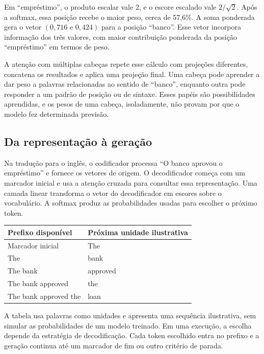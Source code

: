 \documentclass[12pt,a4paper]{article}
\begin{document}
Em ``empréstimo'', o produto escalar vale 2, e o escore escalado vale $2/\sqrt{2}$. Após a softmax, essa posição recebe o maior peso, cerca de 57,6\%. A soma ponderada gera o vetor $(0,716 \text{ e } 0,424)$ para a posição ``banco''. Esse vetor incorpora informação dos três valores, com maior contribuição ponderada da posição ``empréstimo'' em termos de peso.

A atenção com múltiplas cabeças repete esse cálculo com projeções diferentes, concatena os resultados e aplica uma projeção final. Uma cabeça pode aprender a dar peso a palavras relacionadas ao sentido de ``banco'', enquanto outra pode responder a um padrão de posição ou de sintaxe. Esses papéis são possibilidades aprendidas, e os pesos de uma cabeça, isoladamente, não provam por que o modelo fez determinada previsão.

\subsection{Da representação à geração}

Na tradução para o inglês, o codificador processa ``O banco aprovou o empréstimo'' e fornece os vetores de origem. O decodificador começa com um marcador inicial e usa a atenção cruzada para consultar essa representação. Uma camada linear transforma o vetor do decodificador em escores sobre o vocabulário. A softmax produz as probabilidades usadas para escolher o próximo token.

\begin{table}[htbp]
    \centering
    \begin{tabular}{>{\raggedright\arraybackslash}p{6.5cm} >{\raggedright\arraybackslash}p{6.5cm}}
        \toprule
        \textbf{Prefixo disponível} & \textbf{Próxima unidade ilustrativa} \\
        \midrule
        Marcador inicial & The \\
        \addlinespace
        The & bank \\
        \addlinespace
        The bank & approved \\
        \addlinespace
        The bank approved & the \\
        \addlinespace
        The bank approved the & loan \\
        \bottomrule
    \end{tabular}
\end{table}

A tabela usa palavras como unidades e apresenta uma sequência ilustrativa, sem simular as probabilidades de um modelo treinado. Em uma execução, a escolha depende da estratégia de decodificação. Cada token escolhido entra no prefixo e a geração continua até um marcador de fim ou outro critério de parada.
\end{document}
